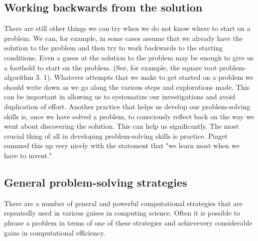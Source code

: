 \documentclass{book}
\begin{document}
\subsection{Working backwards from the  solution}
There are still other things we can try when we do not know where to start on a problem. We can, for example, in some cases assume that we already have the solution to the problem and then try to work backwards to the starting conditions. Even a guess at the solution to the problem may be enough to give us a foothold to start on the problem. (See, for example, the square root problem-algorithm 3. 1). Whatever attempts that we make to get started on a problem we should write down as we go along the various steps and explorations made. This can be important in allowing us to systematize our investigations and avoid duplication of effort. Another practice that helps us develop our problem-solving skills is, once we have solved a problem, to consciously reflect back on the way we went about discovering the solution. This can help us significantly. The most crucial thing of all in developing problem-solving skills is practice. Piaget summed this up very nicely with the statement that "we learn most when we have to invent."

\subsection{General problem-solving strategies}
There are a number of general and powerful computational strategies that are repeatedly used in various guises in computing science. Often it is possible to phrase a problem in terms of one of these strategies and achievevery considerable gains in computational efficiency.
\end{document}

